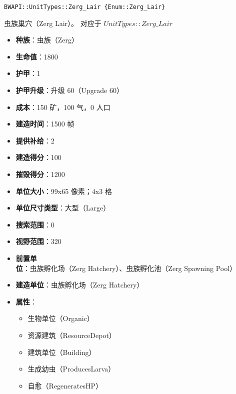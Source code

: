 \begin{tcolorbox}[colback=white, colframe=black!60!white, title=Zerg\_Lair(), arc=0mm]
    \begin{verbatim}
BWAPI::UnitTypes::Zerg_Lair {Enum::Zerg_Lair}
    \end{verbatim}
    虫族巢穴（Zerg Lair）。
    对应于  $UnitTypes::Zerg\_Lair$ 
    \begin{itemize}
        \item \textbf{种族}：虫族（Zerg）
        \item \textbf{生命值}：1800
        \item \textbf{护甲}：1
        \item \textbf{护甲升级}：升级 60（Upgrade 60）
        \item \textbf{成本}：150 矿，100 气，0 人口
        \item \textbf{建造时间}：1500 帧
        \item \textbf{提供补给}：2
        \item \textbf{建造得分}：100
        \item \textbf{摧毁得分}：1200
        \item \textbf{单位大小}：99x65 像素；4x3 格
        \item \textbf{单位尺寸类型}：大型（Large）
        \item \textbf{搜索范围}：0
        \item \textbf{视野范围}：320
        \item \textbf{前置单位}：虫族孵化场（Zerg Hatchery）、虫族孵化池（Zerg Spawning Pool）
        \item \textbf{建造单位}：虫族孵化场（Zerg Hatchery）
        \item \textbf{属性}：
            \begin{itemize}
                \item 生物单位（Organic）
                \item 资源建筑（ResourceDepot）
                \item 建筑单位（Building）
                \item 生成幼虫（ProducesLarva）
                \item 自愈（RegeneratesHP）
            \end{itemize}
    \end{itemize}
\end{tcolorbox}

